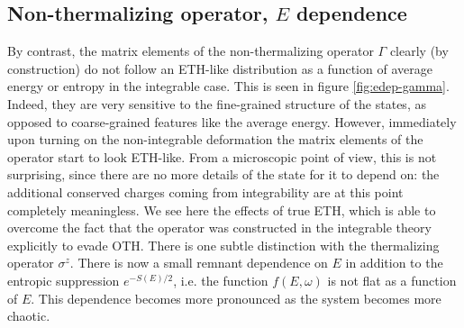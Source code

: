 \subsection{Non-thermalizing operator, $E$ dependence}
By contrast, the matrix elements of the non-thermalizing operator $\Gamma$ clearly (by construction) do not follow an ETH-like distribution as a function of average energy or entropy in the integrable case. This is seen in figure \ref{fig:edep-gamma}. Indeed, they are very sensitive to the fine-grained structure of the states, as opposed to coarse-grained features like the average energy. However, immediately upon turning on the non-integrable deformation the matrix elements of the operator start to look ETH-like. From a microscopic point of view, this is not surprising, since there are no more details of the state for it to depend on: the additional conserved charges coming from integrability are at this point completely meaningless. We see here the effects of true ETH, which is able to overcome the fact that the operator was constructed in the integrable theory explicitly to evade OTH.
 There is one subtle distinction with the thermalizing operator $\sigma^z$. There is now a small remnant dependence on $E$ in addition to the entropic suppression $e^{-S(E)/2}$, i.e. the function $f(E,\omega)$ is not flat as a function of $E$. This dependence becomes more pronounced as the system becomes more chaotic. 
